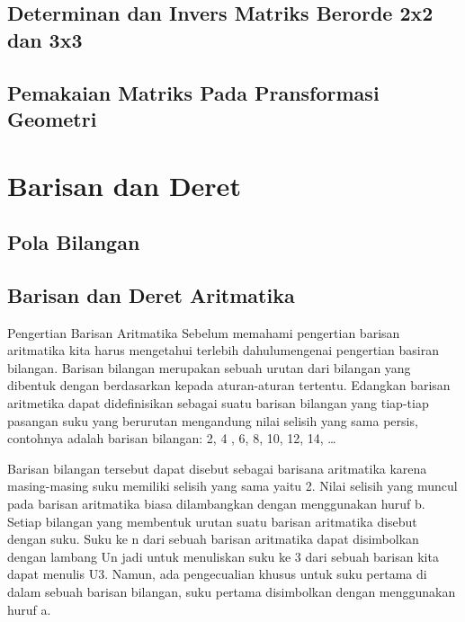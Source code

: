 \documentclass[11pt,fleqn]{book} %
\begin{document}
\section{Determinan dan Invers Matriks Berorde 2x2 dan 3x3 }

\section{Pemakaian Matriks Pada Pransformasi Geometri}



\chapter{Barisan dan Deret}

\section{Pola Bilangan}

\section{Barisan dan Deret Aritmatika}
Pengertian Barisan Aritmatika
Sebelum memahami pengertian barisan aritmatika kita harus mengetahui terlebih dahulumengenai pengertian basiran bilangan. Barisan bilangan merupakan sebuah urutan dari bilangan yang dibentuk dengan berdasarkan kepada aturan-aturan tertentu. Edangkan barisan aritmetika dapat didefinisikan sebagai suatu barisan bilangan yang tiap-tiap pasangan suku yang berurutan mengandung nilai selisih yang sama persis, contohnya adalah barisan bilangan: 2, 4 , 6, 8, 10, 12, 14, …

Barisan bilangan tersebut dapat disebut sebagai barisana aritmatika karena masing-masing suku memiliki selisih yang sama yaitu 2. Nilai selisih yang muncul pada barisan aritmatika biasa dilambangkan dengan menggunakan huruf b. Setiap bilangan yang membentuk urutan suatu barisan aritmatika disebut dengan suku. Suku ke n dari sebuah barisan aritmatika dapat disimbolkan dengan lambang Un jadi untuk menuliskan suku ke 3 dari sebuah barisan kita dapat menulis U3. Namun, ada pengecualian khusus untuk suku pertama di dalam sebuah barisan bilangan, suku pertama disimbolkan dengan menggunakan huruf a.
\end{document}
